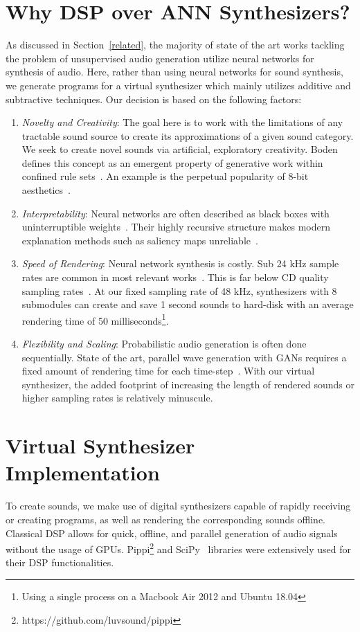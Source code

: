 \documentclass[\main/thesis.tex]{subfiles}
\begin{document}
\section{Why DSP over ANN Synthesizers?}
 As discussed in Section~\ref{related}, the majority of state of the art works tackling the problem of unsupervised audio generation utilize neural networks for synthesis of audio. Here, rather than using neural networks for sound synthesis, we generate programs for a virtual synthesizer which mainly utilizes additive and subtractive techniques. Our decision is based on the following factors:
\begin{enumerate}[label=(\roman*)]
    \item \textit{Novelty and Creativity}: The goal here is to work with the limitations of any tractable sound source to create its approximations of a given sound category. We seek to create novel sounds via artificial, exploratory creativity. Boden defines this concept as an emergent property of generative work within confined rule sets~\cite{boden2009computer}. An example is the perpetual popularity of 8-bit aesthetics~\cite{collins2007loop}. 
    \item \textit{Interpretability}: Neural networks are often described as black boxes with uninterruptible weights~\cite{basheer2000artificial}. Their highly recursive structure makes modern explanation methods such as saliency maps unreliable~\cite{rudin2019stop}.  
    \item \textit{Speed of Rendering}: Neural network synthesis is costly. Sub 24 kHz sample rates are common in most relevant works~\cite{yamamoto2020parallel,oord2017parallel,aouameur2019neural,ramires2020neural}. This is far below CD quality sampling rates~\cite{reiss2016meta}. At our fixed sampling rate of 48 kHz, synthesizers with 8 submodules can create and save 1 second sounds to hard-disk with an average rendering time of 50 milliseconds\footnote{Using a single process on a Macbook Air 2012 and Ubuntu 18.04}. 
    \item \textit{Flexibility and Scaling}: Probabilistic audio generation is often done sequentially. State of the art, parallel wave generation with GANs requires a fixed amount of rendering time for each time-step~\cite{yamamoto2020parallel}. With our virtual synthesizer, the added footprint of increasing the length of rendered sounds or higher sampling rates is relatively minuscule.  
\end{enumerate}

\section{Virtual Synthesizer Implementation}
\label{virtual_synth_implementation}
 To create sounds, we make use of digital synthesizers capable of rapidly receiving or creating programs, as well as rendering the corresponding sounds offline. Classical DSP allows for quick, offline, and parallel generation of audio signals without the usage of GPUs. Pippi\footnote{https://github.com/luvsound/pippi} and SciPy~\cite{jones2001scipy} libraries were extensively used for their DSP functionalities. 
\end{document}

